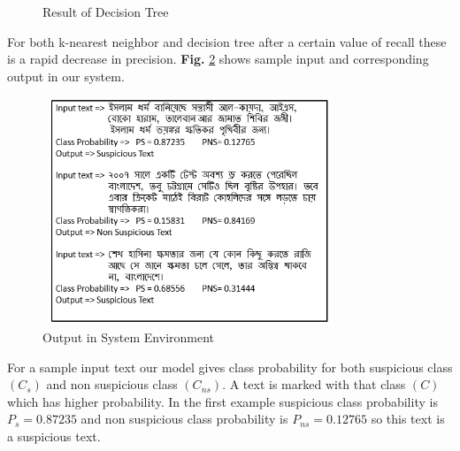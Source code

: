 \begin{figure}[H]
\centering
{}%
\hfill %
%
\caption{Result of Decision Tree}
\label{fdct}
\end{figure}

\noindent
For both k-nearest neighbor and decision tree after a certain value of recall these is a rapid decrease in precision.   
\textbf{Fig.} \ref{fig:out} shows sample input and corresponding output in our system.
\begin{figure}[h!]
\centering
  \includegraphics[height=6.8cm, width=8.8cm]{Figures/sout.PNG}
  \caption{ Output in System Environment}
  \label{fig:out}
\end{figure}

For a sample input text our model gives class probability for both suspicious class $(C_s)$ and non suspicious class $(C_{ns})$. A text is marked with that class $(C)$ which has higher probability. In the first example suspicious class probability is $P_s = 0.87235$ and non suspicious class probability is $P_{ns} = 0.12765$ so this text is a suspicious text.
